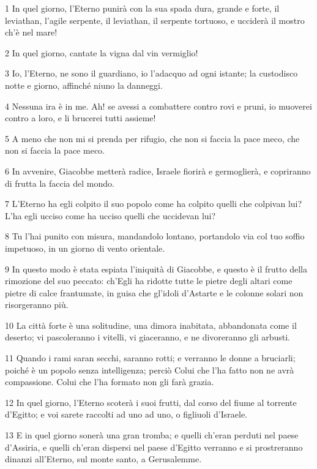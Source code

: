\par 1 In quel giorno, l'Eterno punirà con la sua spada dura, grande e forte, il leviathan, l'agile serpente, il leviathan, il serpente tortuoso, e ucciderà il mostro ch'è nel mare!
\par 2 In quel giorno, cantate la vigna dal vin vermiglio!
\par 3 Io, l'Eterno, ne sono il guardiano, io l'adacquo ad ogni istante; la custodisco notte e giorno, affinché niuno la danneggi.
\par 4 Nessuna ira è in me. Ah! se avessi a combattere contro rovi e pruni, io muoverei contro a loro, e li brucerei tutti assieme!
\par 5 A meno che non mi si prenda per rifugio, che non si faccia la pace meco, che non si faccia la pace meco.
\par 6 In avvenire, Giacobbe metterà radice, Israele fiorirà e germoglierà, e copriranno di frutta la faccia del mondo.
\par 7 L'Eterno ha egli colpito il suo popolo come ha colpito quelli che colpivan lui? L'ha egli ucciso come ha ucciso quelli che uccidevan lui?
\par 8 Tu l'hai punito con misura, mandandolo lontano, portandolo via col tuo soffio impetuoso, in un giorno di vento orientale.
\par 9 In questo modo è stata espiata l'iniquità di Giacobbe, e questo è il frutto della rimozione del suo peccato: ch'Egli ha ridotte tutte le pietre degli altari come pietre di calce frantumate, in guisa che gl'idoli d'Astarte e le colonne solari non risorgeranno più.
\par 10 La città forte è una solitudine, una dimora inabitata, abbandonata come il deserto; vi pascoleranno i vitelli, vi giaceranno, e ne divoreranno gli arbusti.
\par 11 Quando i rami saran secchi, saranno rotti; e verranno le donne a bruciarli; poiché è un popolo senza intelligenza; perciò Colui che l'ha fatto non ne avrà compassione. Colui che l'ha formato non gli farà grazia.
\par 12 In quel giorno, l'Eterno scoterà i suoi frutti, dal corso del fiume al torrente d'Egitto; e voi sarete raccolti ad uno ad uno, o figliuoli d'Israele.
\par 13 E in quel giorno sonerà una gran tromba; e quelli ch'eran perduti nel paese d'Assiria, e quelli ch'eran dispersi nel paese d'Egitto verranno e si prostreranno dinanzi all'Eterno, sul monte santo, a Gerusalemme.

